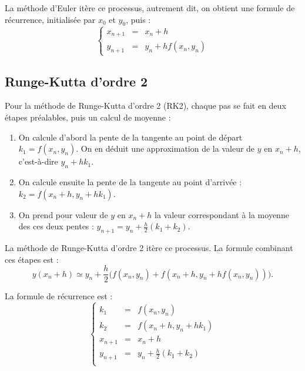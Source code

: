 \documentclass[11pt,class=report,crop=false]{standalone}
\begin{document}



La méthode d'Euler itère ce processus, autrement dit, on obtient une formule de récurrence, initialisée par $x_0$ et $y_0$, puis :
$$
\left\lbrace
\begin{array}{rcl}
  x_{n+1} &=& x_n + h \\  
  y_{n+1} &=& y_n + h f(x_n,y_n)
\end{array}
\right.
$$





\subsection{Runge-Kutta d'ordre 2}

Pour la méthode de Runge-Kutta d'ordre 2 (RK2), chaque pas se fait en deux étapes préalables, puis un calcul de moyenne :
\begin{enumerate}
  \item On calcule d'abord la pente de la tangente au point de départ $k_1 = f(x_n,y_n)$.
  On en déduit une approximation de la valeur de $y$ en $x_n+h$, c'est-à-dire $y_n+h k_1$.
  
  \item On calcule ensuite la pente de la tangente au point d'arrivée : $k_2 = f(x_n+h,y_n+h k_1)$.

  \item On prend pour valeur de $y$ en $x_n+h$ la valeur correspondant à la moyenne des ces deux pentes : $y_{n+1} = y_n + \frac{h}{2} (k_1 + k_2)$.
\end{enumerate}

La méthode de Runge-Kutta d'ordre 2 itère ce processus.
La formule combinant ces étapes est :
$$y(x_n+h) \simeq y_n + \frac{h}{2} \Big(  f(x_n,y_n) + f(x_n+h, y_n + h f(x_n,y_n))\Big).$$

La formule de récurrence est :
$$
\left\lbrace
\begin{array}{rcl}
    k_1 &=& f(x_n,y_n) \\
    k_2 &=& f(x_n + h, y_n + h k_1) \\
    x_{n+1} &=& x_n + h \\
    y_{n+1} &=& y_n + \frac h2 (k_1 + k_2) \\
\end{array}
\right.
$$

\end{document}
